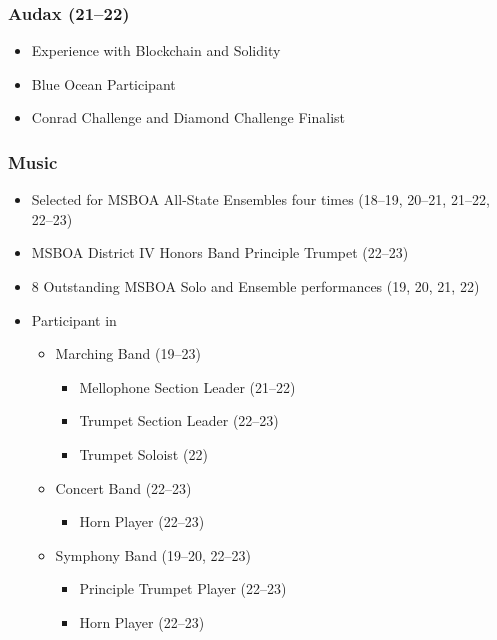 \documentclass[12pt, twocolumn]{article}
\begin{document}
{				\subsubsection*{Audax (21--22)}
					\begin{itemize}
						\item
							Experience with Blockchain and Solidity
						\item
							Blue Ocean Participant
						\item
							Conrad Challenge and Diamond Challenge Finalist
					\end{itemize}
				\subsubsection*{Music}
					\begin{itemize}
						\item 
							Selected for MSBOA All-State Ensembles four times (18--19, 20--21, 21--22, 22--23)
						\item
							MSBOA District IV Honors Band Principle Trumpet (22--23)
						\item
							8 Outstanding MSBOA Solo and Ensemble performances (19, 20, 21, 22)
						\item
							Participant in 
							\begin{itemize}[leftmargin = 13.5pt]
								\item
									Marching Band (19--23)
									\begin{itemize}[leftmargin = 13.5pt]
										\item
											Mellophone Section Leader (21--22)
										\item
											Trumpet Section Leader (22--23)
										\item
											Trumpet Soloist (22)
									\end{itemize}
								\item
									Concert Band (22--23)
									\begin{itemize}[leftmargin = 13.5pt]
										\item
											Horn Player (22--23)
									\end{itemize}
								\item
									Symphony Band (19--20, 22--23)
									\begin{itemize}[leftmargin = 13.5pt]
										\item
											Principle Trumpet Player (22--23)
										\item
											Horn Player (22--23)

\end{itemize}
\end{itemize}
\end{itemize}}
\end{document}
